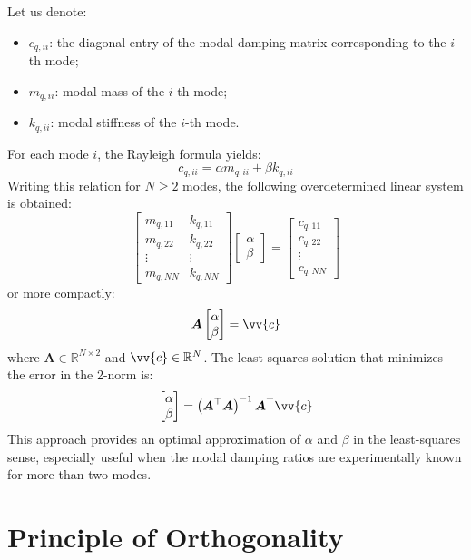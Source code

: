 Let us denote:
\begin{itemize}
    \item \( c_{q,ii} \): the diagonal entry of the modal damping matrix corresponding to the \( i \)-th mode;
    \item \( m_{q,ii} \): modal mass of the \( i \)-th mode;
    \item \( k_{q,ii} \): modal stiffness of the \( i \)-th mode.
\end{itemize}

For each mode \( i \), the Rayleigh formula yields:
\[
c_{q,ii} = \alpha m_{q,ii} + \beta k_{q,ii}
\]
Writing this relation for \( N \geq 2 \) modes, the following overdetermined linear system is obtained:
\[
\begin{bmatrix}
m_{q,11} & k_{q,11} \\
m_{q,22} & k_{q,22} \\
\vdots & \vdots \\
m_{q,NN} & k_{q,NN}
\end{bmatrix}
\begin{bmatrix}
\alpha \\
\beta
\end{bmatrix}
=
\begin{bmatrix}
c_{q,11} \\
c_{q,22} \\
\vdots \\
c_{q,NN}
\end{bmatrix}
\]
or more compactly:
\[
\boldsymbol{A}
\begin{bmatrix}
\alpha \\
\beta
\end{bmatrix}
= \vv{c}
\]
where \( \boldsymbol{A} \in \mathbb{R}^{N \times 2} \) and \( \vv{c} \in \mathbb{R}^{N} \). The least squares solution that minimizes the error in the 2-norm is:
\[
\begin{bmatrix}
\alpha \\
\beta
\end{bmatrix}
=
\left( \boldsymbol{A}^\top \boldsymbol{A} \right)^{-1} \boldsymbol{A}^\top \vv{c}
\]
This approach provides an optimal approximation of \( \alpha \) and \( \beta \) in the least-squares sense, especially useful when the modal damping ratios are experimentally known for more than two modes.

\section{Principle of Orthogonality}

